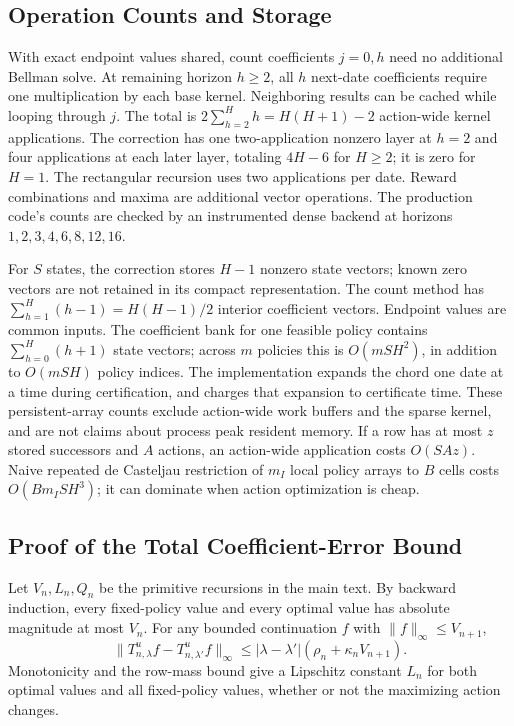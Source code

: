 \subsection{Operation Counts and Storage}
With exact endpoint values shared, count coefficients $j=0,h$ need no additional Bellman solve. At remaining horizon $h\geq2$, all $h$ next-date coefficients require one multiplication by each base kernel. Neighboring results can be cached while looping through $j$. The total is
$2\sum_{h=2}^Hh=H(H+1)-2$ action-wide kernel applications. The correction has one two-application nonzero layer at $h=2$ and four applications at each later layer, totaling $4H-6$ for $H\geq2$; it is zero for $H=1$. The rectangular recursion uses two applications per date. Reward combinations and maxima are additional vector operations. The production code's counts are checked by an instrumented dense backend at horizons $1,2,3,4,6,8,12,16$.

For $S$ states, the correction stores $H-1$ nonzero state vectors; known zero vectors are not retained in its compact representation. The count method has $\sum_{h=1}^H(h-1)=H(H-1)/2$ interior coefficient vectors. Endpoint values are common inputs. The coefficient bank for one feasible policy contains $\sum_{h=0}^H(h+1)$ state vectors; across $m$ policies this is $O(mSH^2)$, in addition to $O(mSH)$ policy indices. The implementation expands the chord one date at a time during certification, and charges that expansion to certificate time. These persistent-array counts exclude action-wide work buffers and the sparse kernel, and are not claims about process peak resident memory. If a row has at most $z$ stored successors and $A$ actions, an action-wide application costs $O(SAz)$. Naive repeated de Casteljau restriction of $m_I$ local policy arrays to $B$ cells costs $O(Bm_ISH^3)$; it can dominate when action optimization is cheap.

\subsection{Proof of the Total Coefficient-Error Bound}
Let $V_n,L_n,Q_n$ be the primitive recursions in the main text. By backward induction, every fixed-policy value and every optimal value has absolute magnitude at most $V_n$. For any bounded continuation $f$ with $\|f\|_\infty\leq V_{n+1}$,
\[
 \|T^u_{n,\lambda}f-T^u_{n,\lambda'}f\|_\infty
 \leq|\lambda-\lambda'|(\rho_n+\kappa_nV_{n+1}).
\]
Monotonicity and the row-mass bound give a Lipschitz constant $L_n$ for both optimal values and all fixed-policy values, whether or not the maximizing action changes.

